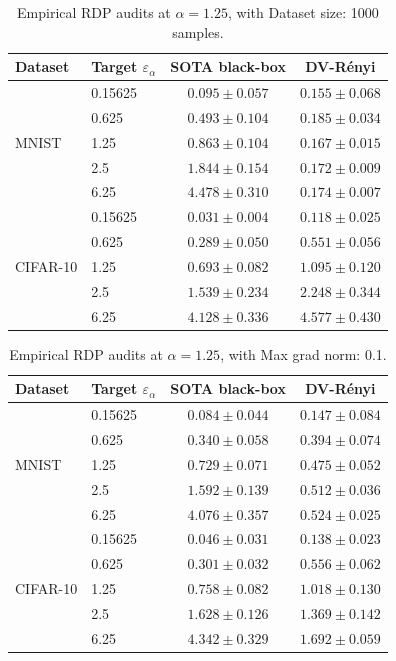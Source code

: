 \documentclass{article}
\theoremstyle{plain}
\theoremstyle{definition}
\theoremstyle{remark}
\begin{document}
\begin{table}[t]
\centering
\caption{Empirical RDP audits at $\alpha=1.25$, with Dataset size: 1000 samples.}
\label{tab:alpha125-1000samples}
\begin{tabular}{llcc}
\toprule
Dataset & Target $\varepsilon_\alpha$ & SOTA black-box \cite{muthu2024nearly} & DV-R\'enyi \\
\midrule
\multirow{5}{*}{MNIST} & 0.15625 & $0.095 \pm 0.057$ & $\mathbf{0.155} \pm 0.068$ \\
 & 0.625 & $\mathbf{0.493} \pm 0.104$ & $0.185 \pm 0.034$ \\
 & 1.25 & $\mathbf{0.863} \pm 0.104$ & $0.167 \pm 0.015$ \\
 & 2.5 & $\mathbf{1.844} \pm 0.154$ & $0.172 \pm 0.009$ \\
 & 6.25 & $\mathbf{4.478} \pm 0.310$ & $0.174 \pm 0.007$ \\
\midrule
\multirow{5}{*}{CIFAR-10} & 0.15625 & $0.031 \pm 0.004$ & $\mathbf{0.118} \pm 0.025$ \\
 & 0.625 & $0.289 \pm 0.050$ & $\mathbf{0.551} \pm 0.056$ \\
 & 1.25 & $0.693 \pm 0.082$ & $\mathbf{1.095} \pm 0.120$ \\
 & 2.5 & $1.539 \pm 0.234$ & $\mathbf{2.248} \pm 0.344$ \\
 & 6.25 & $4.128 \pm 0.336$ & $\mathbf{4.577} \pm 0.430$ \\
\bottomrule
\end{tabular}
\end{table}

\begin{table}[t]
\centering
\caption{Empirical RDP audits at $\alpha=1.25$, with Max grad norm: 0.1.}
\label{tab:alpha125-0.1}
\begin{tabular}{llcc}
\toprule
Dataset & Target $\varepsilon_\alpha$ & SOTA black-box \cite{muthu2024nearly} & DV-R\'enyi \\
\midrule
\multirow{5}{*}{MNIST} & 0.15625 & $0.084 \pm 0.044$ & $\mathbf{0.147} \pm 0.084$ \\
 & 0.625 & $0.340 \pm 0.058$ & $\mathbf{0.394} \pm 0.074$ \\
 & 1.25 & $\mathbf{0.729} \pm 0.071$ & $0.475 \pm 0.052$ \\
 & 2.5 & $\mathbf{1.592} \pm 0.139$ & $0.512 \pm 0.036$ \\
 & 6.25 & $\mathbf{4.076} \pm 0.357$ & $0.524 \pm 0.025$ \\
\midrule
\multirow{5}{*}{CIFAR-10} & 0.15625 & $0.046 \pm 0.031$ & $\mathbf{0.138} \pm 0.023$ \\
 & 0.625 & $0.301 \pm 0.032$ & $\mathbf{0.556} \pm 0.062$ \\
 & 1.25 & $0.758 \pm 0.082$ & $\mathbf{1.018} \pm 0.130$ \\
 & 2.5 & $\mathbf{1.628} \pm 0.126$ & $1.369 \pm 0.142$ \\
 & 6.25 & $\mathbf{4.342} \pm 0.329$ & $1.692 \pm 0.059$ \\
\bottomrule
\end{tabular}
\end{table}
\end{document}
